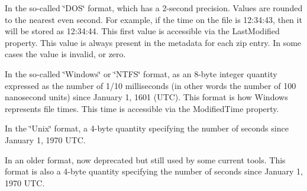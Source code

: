 \begin{DoxyItemize}
\item In the so-\/called \char`\"{}\+D\+O\+S\char`\"{} format, which has a 2-\/second precision. Values are rounded to the nearest even second. For example, if the time on the file is 12\+:34\+:43, then it will be stored as 12\+:34\+:44. This first value is accessible via the {\ttfamily Last\+Modified} property. This value is always present in the metadata for each zip entry. In some cases the value is invalid, or zero. 


\item In the so-\/called \char`\"{}\+Windows\char`\"{} or \char`\"{}\+N\+T\+F\+S\char`\"{} format, as an 8-\/byte integer quantity expressed as the number of 1/10 milliseconds (in other words the number of 100 nanosecond units) since January 1, 1601 (U\+TC). This format is how Windows represents file times. This time is accessible via the {\ttfamily Modified\+Time} property. 


\item In the \char`\"{}\+Unix\char`\"{} format, a 4-\/byte quantity specifying the number of seconds since January 1, 1970 U\+TC. 


\item In an older format, now deprecated but still used by some current tools. This format is also a 4-\/byte quantity specifying the number of seconds since January 1, 1970 U\+TC. 


\end{DoxyItemize}

